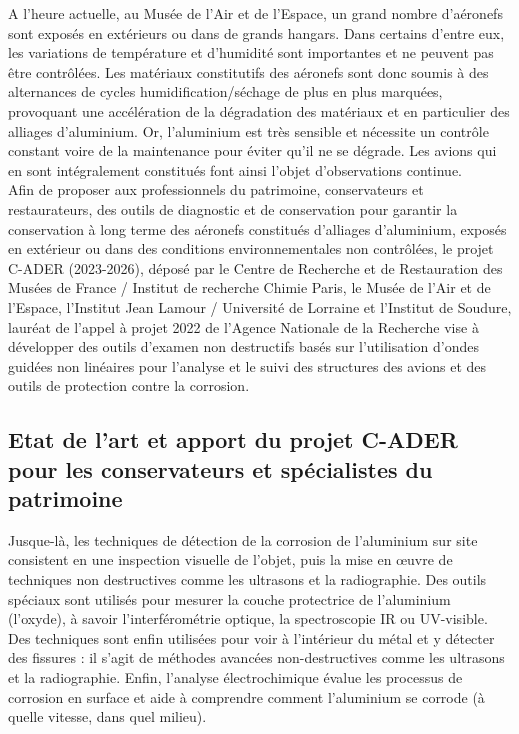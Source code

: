 A l’heure actuelle, au Musée de l’Air et de l’Espace, un grand nombre d’aéronefs sont exposés en extérieurs ou dans de grands hangars. Dans certains d'entre eux, les variations de température et d’humidité sont importantes et ne peuvent pas être contrôlées. Les matériaux constitutifs des aéronefs sont donc soumis à des alternances de cycles humidification/séchage de plus en plus marquées, provoquant une accélération de la dégradation des matériaux et en particulier des alliages d’aluminium. Or, l’aluminium est très sensible et nécessite un contrôle constant voire de la maintenance pour éviter qu’il ne se dégrade. Les avions qui en sont intégralement constitués font ainsi l’objet d’observations continue.\\

Afin de proposer aux professionnels du patrimoine, conservateurs et restaurateurs, des outils de diagnostic et de conservation pour garantir la conservation à long terme des aéronefs constitués d’alliages d’aluminium, exposés en extérieur ou dans des conditions environnementales non contrôlées, le projet C-ADER (2023-2026), déposé par le Centre de Recherche et de Restauration des Musées de France / Institut de recherche Chimie Paris, le Musée de l’Air et de l’Espace, l’Institut Jean Lamour / Université de Lorraine et l’Institut de Soudure, lauréat de l’appel à projet 2022 de l’Agence Nationale de la Recherche vise à développer des outils d’examen non destructifs basés sur l'utilisation d'ondes guidées non linéaires pour l'analyse et le suivi des structures des avions et des outils de protection contre la corrosion.

        \subsection{Etat de l'art et apport du projet C-ADER  pour les conservateurs et spécialistes du patrimoine}

Jusque-là, les techniques de détection de la corrosion de l’aluminium sur site consistent en une inspection visuelle de l’objet, puis la mise en œuvre de techniques non destructives comme les ultrasons et la radiographie. Des outils spéciaux sont utilisés pour mesurer la couche protectrice de l’aluminium (l’oxyde), à savoir l’interférométrie optique, la spectroscopie IR ou UV-visible. Des techniques sont enfin utilisées pour voir à l’intérieur du métal et y détecter des fissures : il s’agit de méthodes avancées non-destructives comme les ultrasons et la radiographie. Enfin, l'analyse électrochimique évalue les processus de corrosion en surface et aide à comprendre comment l'aluminium se corrode (à quelle vitesse, dans quel milieu).\\

